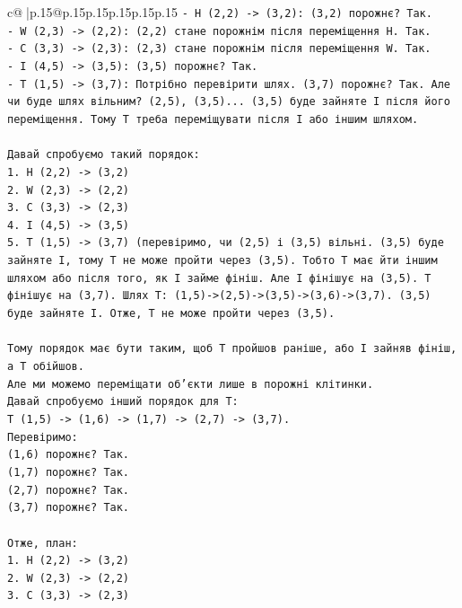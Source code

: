 \documentclass{article}
\begin{document}
{\begin{supertabular}{c@{$\;$}|p{.15\linewidth}@{}p{.15\linewidth}p{.15\linewidth}p{.15\linewidth}p{.15\linewidth}p{.15\linewidth}}
{{{\texttt{{-} H (2,2) {-}> (3,2): (3,2) порожнє? Так.} \\
\texttt{{-} W (2,3) {-}> (2,2): (2,2) стане порожнім після переміщення H. Так.} \\
\texttt{{-} C (3,3) {-}> (2,3): (2,3) стане порожнім після переміщення W. Так.} \\
\texttt{{-} I (4,5) {-}> (3,5): (3,5) порожнє? Так.} \\
\texttt{{-} T (1,5) {-}> (3,7): Потрібно перевірити шлях. (3,7) порожнє? Так. Але чи буде шлях вільним? (2,5), (3,5)... (3,5) буде зайняте I після його переміщення. Тому T треба переміщувати після I або іншим шляхом.} \\
\\ 
\texttt{Давай спробуємо такий порядок:} \\
\texttt{1. H (2,2) {-}> (3,2)} \\
\texttt{2. W (2,3) {-}> (2,2)} \\
\texttt{3. C (3,3) {-}> (2,3)} \\
\texttt{4. I (4,5) {-}> (3,5)} \\
\texttt{5. T (1,5) {-}> (3,7) (перевіримо, чи (2,5) і (3,5) вільні. (3,5) буде зайняте I, тому T не може пройти через (3,5). Тобто T має йти іншим шляхом або після того, як I займе фініш. Але I фінішує на (3,5). T фінішує на (3,7). Шлях T: (1,5){-}>(2,5){-}>(3,5){-}>(3,6){-}>(3,7). (3,5) буде зайняте I. Отже, T не може пройти через (3,5).} \\
\\ 
\texttt{Тому порядок має бути таким, щоб T пройшов раніше, або I зайняв фініш, а T обійшов.} \\
\texttt{Але ми можемо переміщати об'єкти лише в порожні клітинки.} \\
\texttt{Давай спробуємо інший порядок для T:} \\
\texttt{T (1,5) {-}> (1,6) {-}> (1,7) {-}> (2,7) {-}> (3,7).} \\
\texttt{Перевіримо:} \\
\texttt{(1,6) порожнє? Так.} \\
\texttt{(1,7) порожнє? Так.} \\
\texttt{(2,7) порожнє? Так.} \\
\texttt{(3,7) порожнє? Так.} \\
\\ 
\texttt{Отже, план:} \\
\texttt{1. H (2,2) {-}> (3,2)} \\
\texttt{2. W (2,3) {-}> (2,2)} \\
\texttt{3. C (3,3) {-}> (2,3)} \\
}}}
\end{supertabular}}
\end{document}
